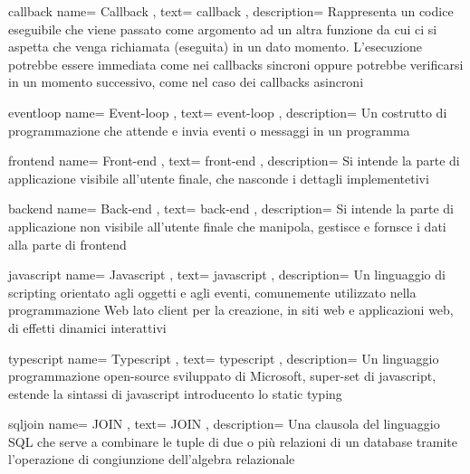 \newglossaryentry
{callback}
{
	name={
		Callback
	},
	text={
		callback
	},
	description={
		Rappresenta un codice eseguibile che viene passato come argomento ad un altra funzione da cui ci si aspetta che venga richiamata (eseguita) in un dato momento. L'esecuzione potrebbe essere immediata come nei callbacks sincroni oppure potrebbe verificarsi in un momento successivo, come nel caso dei callbacks asincroni
	}
}

\newglossaryentry
{eventloop}
{
	name={
		Event-loop
	},
	text={
		event-loop
	},
	description={
		Un costrutto di programmazione che attende e invia eventi o messaggi in un programma
	}
}

\newglossaryentry
{frontend}
{
	name={
		Front-end
	},
	text={
		front-end
	},
	description={
		Si intende la parte di applicazione visibile all'utente finale, che nasconde i dettagli implementetivi
	}
}

\newglossaryentry
{backend}
{
	name={
		Back-end
	},
	text={
		back-end
	},
	description={
		Si intende la parte di applicazione non visibile all'utente finale che manipola, gestisce e fornsce i dati alla parte di \gls{frontend}
	}
}

\newglossaryentry
{javascript}
{
	name={
		Javascript
	},
	text={
		javascript
	},
	description={
		Un linguaggio di scripting orientato agli oggetti e agli eventi, comunemente utilizzato nella programmazione Web lato client per la creazione, in siti web e applicazioni web, di effetti dinamici interattivi
	}
}

\newglossaryentry
{typescript}
{
	name={
		Typescript
	},
	text={
		typescript
	},
	description={
		Un linguaggio programmazione open-source sviluppato di Microsoft, super-set di \gls{javascript}, estende la sintassi di \gls{javascript} introducento lo static typing
	}
}

\newglossaryentry
{sqljoin}
{
name={
	JOIN
},
text={
	JOIN
},
description={
	Una clausola del linguaggio SQL che serve a combinare le tuple di due o più relazioni di un database tramite l'operazione di congiunzione dell'algebra relazionale
}
}